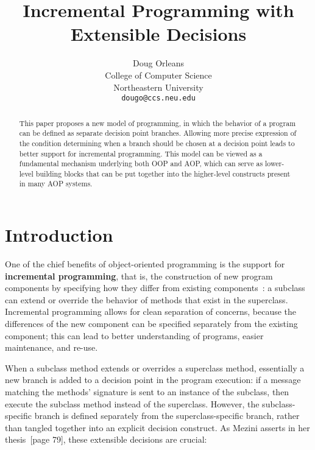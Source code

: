 \documentclass{article}
\title{Incremental Programming with Extensible Decisions}
\author{Doug Orleans \\
College of Computer Science\\
Northeastern University \\
\texttt{dougo@ccs.neu.edu}
}
\newcommand{\defn}[1]{\textbf{#1}}
\begin{document}

\maketitle


\begin{abstract}
This paper proposes a new model of programming, in which the behavior
of a program can be defined as separate decision point branches.  
Allowing more precise expression of the condition
determining when a branch should be chosen at a decision point leads
to better support for incremental programming.  
This model can be viewed as a fundamental
mechanism underlying both OOP and AOP, which can serve as lower-level
building blocks that can be put together into the higher-level
constructs present in many AOP systems.
\end{abstract}

\section{Introduction}

One of the chief benefits of object-oriented programming is the
support for \defn{incremental programming}, that is, the construction
of new program components by specifying how they differ from existing
components~\cite{cook89denotational}: a subclass can extend or
override the behavior of methods that exist in the superclass.
Incremental programming allows for clean separation of concerns,
because the differences of the new component can be specified
separately from the existing component; this can lead to better
understanding of programs, easier maintenance, and re-use.

When a subclass method extends or overrides a superclass method,
essentially a new branch is added to a decision point in the program
execution: if a message matching the methods' signature is sent to
an instance of the subclass, then execute the subclass method instead
of the superclass.  However, the subclass-specific branch is defined
separately from the superclass-specific branch, rather than tangled
together into an explicit decision construct.  As Mezini asserts in
her thesis~\cite{mezini-thesis}[page 79], these extensible decisions
are crucial:
\end{document}
